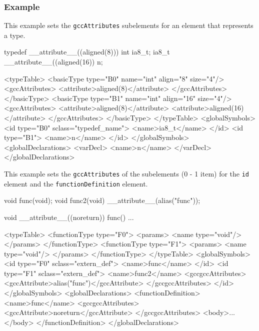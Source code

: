 {\subsubsection*{Example}

This example sets the {\tt gccAttributes} subelements for an element that represents a type.
\vspace{2mm}

\begin{CExample}
  typedef __attribute__((aligned(8))) int ia8_t;
  ia8_t __attribute__((aligned(16)) n;
\end{CExample}
\vspace{1mm}

\begin{XcodeMLExample}
 <typeTable>
    <basicType type="B0" name="int" align="8" size="4"/>
      <gccAttributes>
        <attribute>aligned(8)</attribute>
     </gccAttributes>
    </basicType>
    <basicType type="B1" name="int" align="16" size="4"/>
     <gccAttributes>
        <attribute>aligned(8)</attribute>
        <attribute>aligned(16)</attribute>
      </gccAttributes>
   </basicType>
  </typeTable>
 <globalSymbols>
   <id type="B0" sclass="typedef_name">
      <name>ia8_t</name>
    </id>
   <id type="B1">
      <name>n</name>
    </id>
  </globalSymbols>
 <globalDeclarations>
    <varDecl>
      <name>n</name>
    </varDecl>
  </globalDeclarations>
\end{XcodeMLExample}

This example sets the {\tt gccAttributes} of the subelements (0 - 1 item) for the {\tt id} element and the {\tt functionDefinition} element.
\vspace{2mm} 

\begin{CExample}
 void func(void);
 void func2(void) __attribute__(alias("func")); 
  
  void __attribute__((noreturn)) func() {
     ...
  }
\end{CExample}
\vspace{1mm} 
 
\begin{XcodeMLExample}
 <typeTable>
   <functionType type="F0">
     <params>
        <name type="void"/>
      </params>
    </functionType>
    <functionType type="F1">
      <params>
        <name type="void"/>
      </params>
    </functionType>
  </typeTable>
  <globalSymbols>
    <id type="F0" sclass="extern_def">
      <name>func</name>
    </id>
    <id type="F1" sclass="extern_def">
      <name>func2</name>
      <gccgccAttributes>
        <gccAttribute>alias("func")</gccAttribute>
      </gccgccAttributes>
    </id>
  </globalSymbols>
  <globalDeclarations>
    <functionDefinition>
      <name>func</name>
      <gccgccAttributes>
        <gccAttribute>noreturn</gccAttribute>
      </gccgccAttributes>
      <body>...</body>
    </functionDefinition>
  </globalDeclarations>
\end{XcodeMLExample}


}
